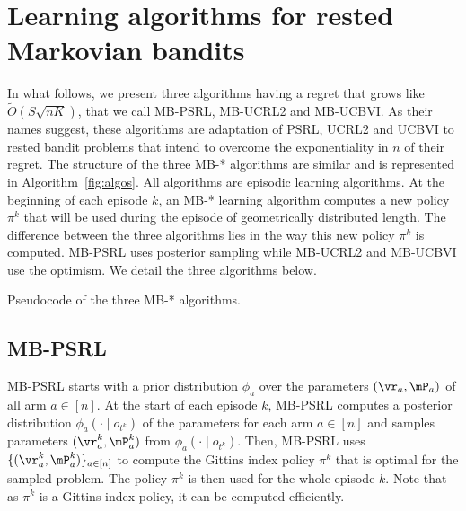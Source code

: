 \section{Learning algorithms for rested Markovian bandits}
\label{ch:rested:sec:learning_algorithms}

In what follows, we present three algorithms having a regret that grows like $\tilde{O}(S\sqrt{nK})$, that we call MB-PSRL, MB-UCRL2 and MB-UCBVI. As their names suggest, these algorithms are adaptation of PSRL, UCRL2 and UCBVI to rested bandit problems that intend to overcome the exponentiality in $n$ of their regret. The structure of the three MB-* algorithms are similar and is represented in Algorithm~\ref{fig:algos}. All algorithms are episodic learning algorithms. At the beginning of each episode $k$, an MB-* learning algorithm computes a new policy $\pi^k$ that will be used during the episode of geometrically distributed length. The difference between the three algorithms lies in the way this new policy $\pi^k$ is computed. MB-PSRL uses posterior sampling while MB-UCRL2 and MB-UCBVI use the optimism. We detail the three algorithms below. 

\begin{algorithm}[ht]
    \BlankLine
    \caption{Pseudocode of the three MB-* algorithms.}
    \label{fig:algos}
\end{algorithm}

\subsection{MB-PSRL}
MB-PSRL starts with a prior distribution \(\phi_{a}\) over the parameters \((\vr_a,\mP_a)\) of all arm $a\in[n]$. At the start of each episode $k$, MB-PSRL computes
a posterior distribution \(\phi_a(\cdot \mid o_{t^k})\) of the parameters for
each arm $a\in[n]$ and samples parameters \((\vr^k_a,\mP^k_a)\) from
\(\phi_a(\cdot \mid o_{t^k})\). Then, MB-PSRL uses \(\{(\vr^k_a,\mP^k_a)\}_{a\in[n]}\)
to compute the Gittins index policy $\pi^k$ that is optimal for the sampled
problem.  The policy \(\pi^k\)  is then used for the whole episode \(k\). Note that as $\pi^k$ is a Gittins index policy, it can be computed efficiently. 

